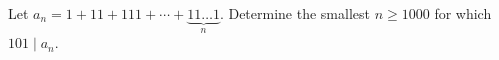 Let $a_n=1+11+111+\cdots+\underbrace{11\ldots1}_{n}$. Determine the smallest $n\ge1000$ for which $101\mid a_n$.
